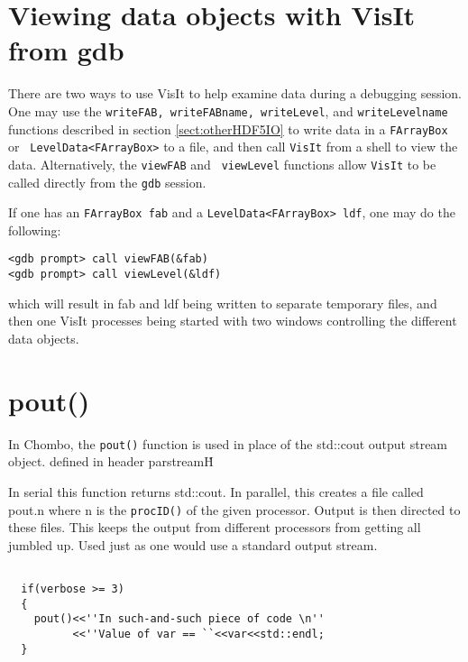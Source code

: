 \section{Viewing data objects with VisIt from gdb}
There are two ways to use VisIt to help examine data during a
debugging session.  One may use the {\tt writeFAB, writeFABname,
  writeLevel}, and {\tt writeLevelname} functions described in section
\ref{sect:otherHDF5IO} to write data in a {\tt FArrayBox} or {\tt
  LevelData<FArrayBox>} to a file, and then call {\tt VisIt} from
a shell to view the data.  Alternatively, the {\tt viewFAB} and {\tt
  viewLevel} functions allow {\tt VisIt} to be called directly
from the {\tt gdb} session.  

If
one has an {\tt FArrayBox fab} and a {\tt LevelData<FArrayBox> ldf},
one may do the following:

\begin{verbatim}
<gdb prompt> call viewFAB(&fab)
<gdb prompt> call viewLevel(&ldf)
\end{verbatim}
which will result in fab and ldf being written to separate temporary
files, and then one VisIt processes being started with two windows controlling the
different data objects.



\section{pout()}

  In Chombo, the \verb+pout()+ function is used in place of the std::cout
output stream object. defined in header parstream\.H

In serial this function returns std::cout.  In parallel, this creates a file
called pout.n where n is the \verb+procID()+ of the given processor.  Output
is then directed to these files.  This keeps the output from
different processors from getting all jumbled up.  Used just as one
would use a standard output stream.

\begin{verbatim}

  if(verbose >= 3)
  {
    pout()<<''In such-and-such piece of code \n''
          <<''Value of var == ``<<var<<std::endl;
  }
\end{verbatim}
